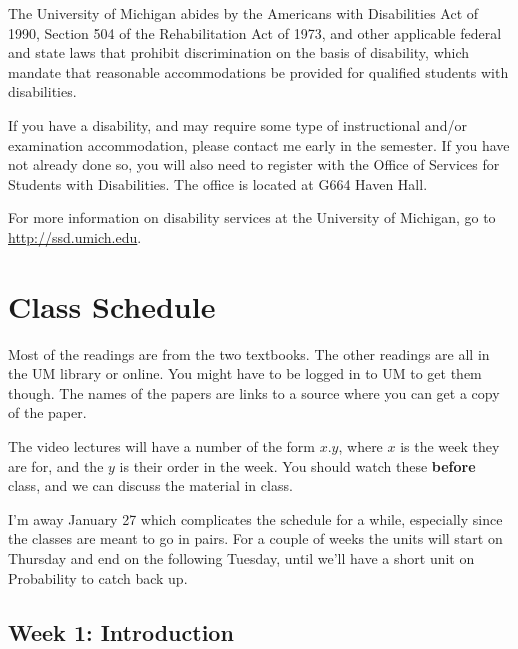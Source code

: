 \documentclass[
]{article}
\begin{document}
The University of Michigan abides by the Americans with Disabilities Act
of 1990, Section 504 of the Rehabilitation Act of 1973, and other
applicable federal and state laws that prohibit discrimination on the
basis of disability, which mandate that reasonable accommodations be
provided for qualified students with disabilities.

If you have a disability, and may require some type of instructional
and/or examination accommodation, please contact me early in the
semester. If you have not already done so, you will also need to
register with the Office of Services for Students with Disabilities. The
office is located at G664 Haven Hall.

For more information on disability services at the University of
Michigan, go to \url{http://ssd.umich.edu}.

\newpage

\hypertarget{class-schedule}{%
\section{Class Schedule}\label{class-schedule}}

Most of the readings are from the two textbooks. The other readings are
all in the UM library or online. You might have to be logged in to UM to
get them though. The names of the papers are links to a source where you
can get a copy of the paper.

The video lectures will have a number of the form \(x.y\), where \(x\)
is the week they are for, and the \(y\) is their order in the week. You
should watch these \textbf{before} class, and we can discuss the
material in class.

I'm away January 27 which complicates the schedule for a while,
especially since the classes are meant to go in pairs. For a couple of
weeks the units will start on Thursday and end on the following Tuesday,
until we'll have a short unit on Probability to catch back up.

\hypertarget{week-1-introduction}{%
\subsection{Week 1: Introduction}\label{week-1-introduction}}
\end{document}
